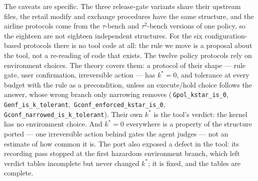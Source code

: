\documentclass[a4paper,UKenglish,cleveref,autoref,thm-restate,anonymous]{lipics-v2021}
\newcommand{\coqok}[1]{\textcolor{okgreen}{\ding{51}}\,\texttt{\small #1}}
\newcommand{\kstar}{k^{*}}
\begin{document}
The caveats are specific. The three release-gate variants share their upstream
files, the retail modify and exchange procedures have the same structure, and the
airline protocols come from the $\tau$-bench and $\tau^2$-bench versions of one
policy, so the eighteen are not eighteen independent structures. For the six
configuration-based protocols there is no tool code at all: the rule we move is a
proposal about the tool, not a re-reading of code that exists. The twelve policy
protocols rely on environment choices. The theory covers them: a protocol of their
shape --- rule gate, user confirmation, irreversible action --- has $\kstar=0$,
and tolerance at every budget with the rule as a precondition, unless an
execute/hold choice follows the answer, whose wrong branch only narrowing removes
(\coqok{Gpol\_kstar\_is\_0}, \coqok{Genf\_is\_k\_tolerant},
\coqok{Gconf\_enforced\_kstar\_is\_0}, \coqok{Gconf\_narrowed\_is\_k\_tolerant}).
Their own $\kstar$ is the tool's verdict: the kernel has no environment choice. And $\kstar=0$ everywhere is a property of the
structure ported --- one irreversible action behind gates the agent judges --- not
an estimate of how common it is. The port also exposed a defect in the tool: its
recording pass stopped at the first hazardous environment branch, which left
verdict tables incomplete but never changed $\kstar$; it is fixed, and the
tables are complete.
\end{document}

